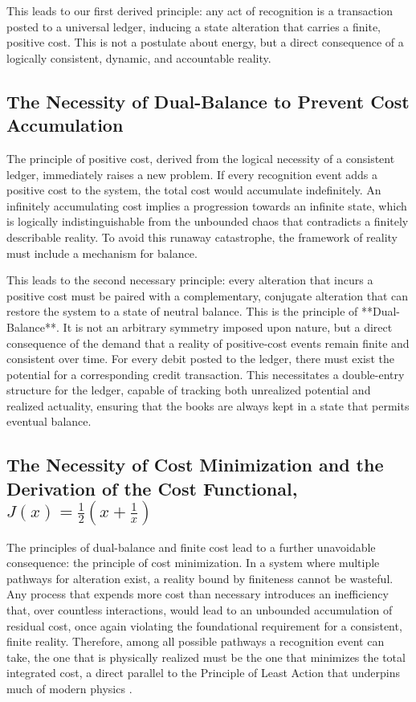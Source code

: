 This leads to our first derived principle: any act of recognition is a transaction posted to a universal ledger, inducing a state alteration that carries a finite, positive cost. This is not a postulate about energy, but a direct consequence of a logically consistent, dynamic, and accountable reality.

\subsection{The Necessity of Dual-Balance to Prevent Cost Accumulation}
The principle of positive cost, derived from the logical necessity of a consistent ledger, immediately raises a new problem. If every recognition event adds a positive cost to the system, the total cost would accumulate indefinitely. An infinitely accumulating cost implies a progression towards an infinite state, which is logically indistinguishable from the unbounded chaos that contradicts a finitely describable reality. To avoid this runaway catastrophe, the framework of reality must include a mechanism for balance.

This leads to the second necessary principle: every alteration that incurs a positive cost must be paired with a complementary, conjugate alteration that can restore the system to a state of neutral balance. This is the principle of **Dual-Balance**. It is not an arbitrary symmetry imposed upon nature, but a direct consequence of the demand that a reality of positive-cost events remain finite and consistent over time. For every debit posted to the ledger, there must exist the potential for a corresponding credit transaction. This necessitates a double-entry structure for the ledger, capable of tracking both unrealized potential and realized actuality, ensuring that the books are always kept in a state that permits eventual balance.

\subsection{The Necessity of Cost Minimization and the Derivation of the Cost Functional, \texorpdfstring{$J(x) = \frac{1}{2}(x + \frac{1}{x})$}{J(x) = 1/2(x + 1/x)}}

The principles of dual-balance and finite cost lead to a further unavoidable consequence: the principle of cost minimization. In a system where multiple pathways for alteration exist, a reality bound by finiteness cannot be wasteful. Any process that expends more cost than necessary introduces an inefficiency that, over countless interactions, would lead to an unbounded accumulation of residual cost, once again violating the foundational requirement for a consistent, finite reality. Therefore, among all possible pathways a recognition event can take, the one that is physically realized must be the one that minimizes the total integrated cost, a direct parallel to the Principle of Least Action that underpins much of modern physics \parencite{Landau1976}.

